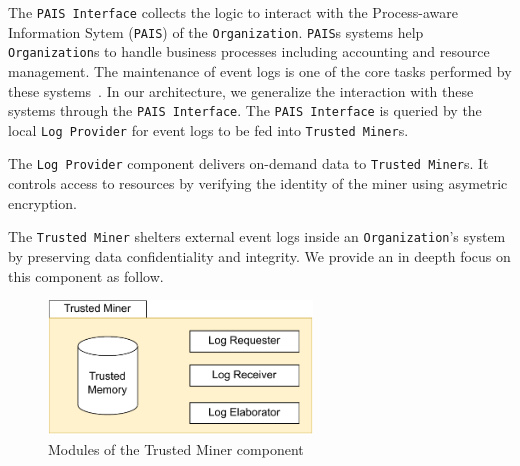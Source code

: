 The \texttt{PAIS Interface} collects the logic to interact with the Process-aware Information Sytem (\texttt{PAIS}) of the \texttt{Organization}. \texttt{PAIS}s systems help \texttt{Organization}s to handle business processes including accounting and resource management. The maintenance of event logs is one of the core tasks performed by these systems~\cite{Dumas.etal/2018:FundamentalsofBPM}. In our architecture, we generalize the interaction with these systems through the \texttt{PAIS Interface}. The \texttt{PAIS Interface} is queried by the local \texttt{Log Provider} for event logs to be fed into \texttt{Trusted Miner}s. 


The \texttt{Log Provider} component delivers on-demand data to \texttt{Trusted Miner}s. %
It controls access to resources by verifying the identity of the miner %
using asymetric encryption. %

The \texttt{Trusted Miner} shelters external event logs inside an \texttt{Organization}'s system by preserving data confidentiality and integrity. We provide an in deepth focus on this component as follow.

\begin{figure}[t]
\centering
\includegraphics[width=7cm]{content/figures/trusted_miner.pdf}
\caption{Modules of the Trusted Miner component}
\label{fig:trusted_miner}
\end{figure}




